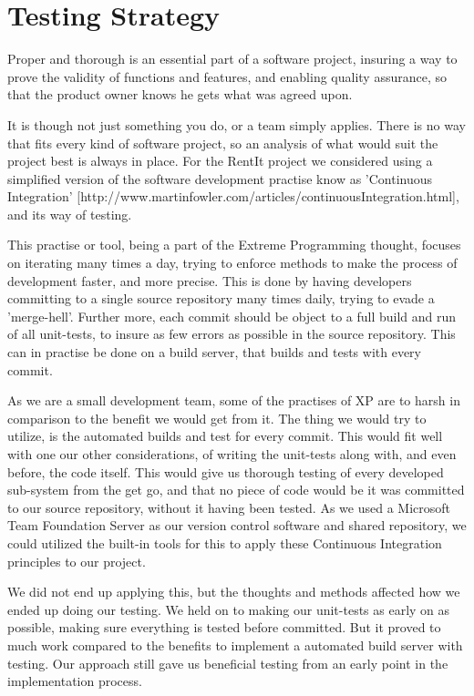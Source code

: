 \section{Testing Strategy} \label{TestingStrategy}
Proper and thorough is an essential part of a software project, insuring a way to prove the validity of functions and features, and enabling quality assurance, so that the product owner knows he gets what was agreed upon. \

It is though not just something you do, or a team simply applies. There is no way that fits every kind of software project, so an analysis of what would suit the project best is always in place. For the RentIt project we considered using a simplified version of the software development practise know as 'Continuous Integration' [http://www.martinfowler.com/articles/continuousIntegration.html], and its way of testing.

This practise or tool, being a part of the Extreme Programming thought, focuses on iterating many times a day, trying to enforce methods to make the process of development faster, and more precise. This is done by having developers committing to a single source repository many times daily, trying to evade a 'merge-hell'. Further more, each commit should be object to a full build and run of all unit-tests, to insure as few errors as possible in the source repository. This can in practise be done on a build server, that builds and tests with every commit.

As we are a small development team, some of the practises of XP are to harsh in comparison to the benefit we would get from it. The thing we would try to utilize, is the automated builds and test for every commit. This would fit well with one our other considerations, of writing the unit-tests along with, and even before, the code itself. This would give us thorough testing of every developed sub-system from the get go, and that no piece of code would be it was committed to our source repository, without it having been tested. As we used a Microsoft Team Foundation Server as our version control software and shared repository, we could utilized the built-in tools for this to apply these Continuous Integration principles to our project.

We did not end up applying this, but the thoughts and methods affected how we ended up doing our testing. We held on to making our unit-tests as early on as possible, making sure everything is tested before committed. But it proved to much work compared to the benefits to implement a automated build server with testing. Our approach still gave us beneficial testing from an early point in the implementation process.\

